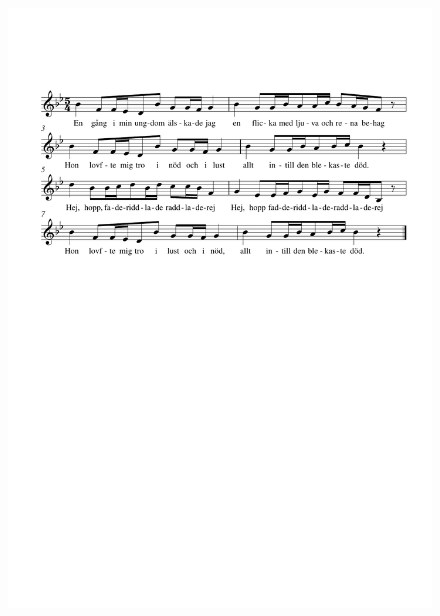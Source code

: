 \documentclass[a6paper,11pt]{article}
\begin{document}
\setlength{\oddsidemargin}{-0.67in}
\begin{center}
\end{center}
\vspace{-40pt}
\begin{figure}[!h]
\centering
\includegraphics[width=\textwidth]{smedsvisa}
\end{figure}
\end{document}
